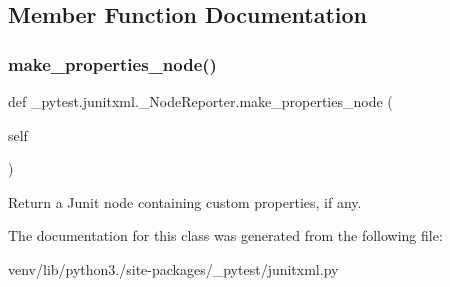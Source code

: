 \subsection{Member Function Documentation}
\mbox{\label{class__pytest_1_1junitxml_1_1___node_reporter_a932d1ec24b8dd56f1d751bd3ac172719}} 
\subsubsection{\texorpdfstring{make\+\_\+properties\+\_\+node()}{make\_properties\_node()}}
{\footnotesize\ttfamily def \+\_\+pytest.\+junitxml.\+\_\+\+Node\+Reporter.\+make\+\_\+properties\+\_\+node (\begin{DoxyParamCaption}\item[{}]{self }\end{DoxyParamCaption})}

\begin{DoxyVerb}Return a Junit node containing custom properties, if any.
\end{DoxyVerb}
 

The documentation for this class was generated from the following file\+:\begin{DoxyCompactItemize}
\item 
venv/lib/python3./site-\/packages/\+\_\+pytest/junitxml.\+py\end{DoxyCompactItemize}
